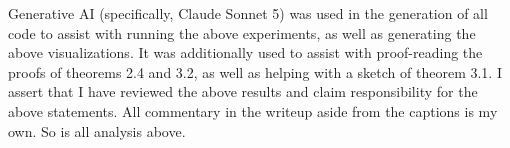 Generative AI (specifically, Claude Sonnet 5) was used in the generation of all code to assist
with running the above experiments, as well as generating the above visualizations. It was
additionally used to assist with proof-reading the proofs of theorems 2.4 and 3.2, as well as
helping with a sketch of theorem 3.1. I assert that I have reviewed the above results and claim
responsibility for the above statements. All commentary in the writeup aside from the captions
is my own. So is all analysis above.
